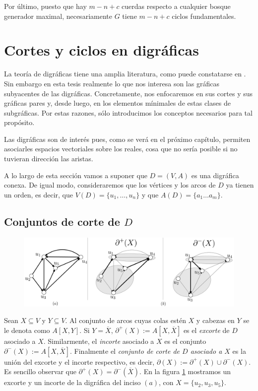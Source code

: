   Por último, puesto que hay $m - n + c$ cuerdas respecto a cualquier bosque generador maximal, necesariamente $G$ tiene $m-n+c$ ciclos fundamentales.
 
 \section{Cortes y ciclos en digráficas}
 La teoría de digráficas tiene una amplia literatura, como puede constatarse en \cite{Bang-Jensen}. Sin embargo en esta tesis realmente lo que nos interesa son las gráficas subyacentes de las digráficas. Concretamente, nos enfocaremos en sus cortes y sus gráficas pares y, desde luego, en los elementos mínimales de estas clases de subgráficas. Por estas razones, sólo introducimos los conceptos necesarios para tal propósito.
 
 Las digráficas son de interés pues, como se verá en el próximo capítulo, permiten asociarles espacios vectoriales sobre los reales, cosa que no sería posible si no tuvieran dirección las aristas. 
 
 A lo largo de esta sección vamos a suponer que $D = (V,A)$ es una digráfica conexa. De igual modo, consideraremos que los vértices y los arcos de $D$ ya tienen un orden, es decir, que $V(D)=\{u_{1}, \ldots, u_{n}\}$ y que $A(D)= \{ a_{1} \ldots a_{m}\}$.


 \subsection{Conjuntos de corte de $D$}
 \begin{figure}[h]
    \centering
\includegraphics[scale=0.18]{img/imgchapter2/ExcorteIncorte.jpg}
    \caption{}
    \label{fig:excorteincorte}
\end{figure}
 
 Sean $X \subseteq V$ y $Y \subseteq V$. Al conjunto de arcos cuyas colas estén $X$ y cabezas en $Y$ se le denota como $A[X,Y]$. Si $Y = \overline{X}$, $\partial^{+} (X) := A[X,\overline{X}]$ es el \textit{excorte} de $D$ asociado a $X$. Similarmente, el \textit{incorte} asociado a $X$ es el conjunto $\partial^{-}(X) := A[X,\overline{X}]$. Finalmente el \textit{conjunto de corte de $D$ asociado a $X$} es la unión del excorte y el incorte respectivo, es decir, $\partial(X) := \partial^{+}(X) \cup \partial^{-}(X)$. Es sencillo observar que $\partial^{+}(X) = \partial^{-}(\overline{X})$. En la figura \ref{fig:excorteincorte} mostramos un excorte y un incorte de la digráfica del inciso $(a)$, con $X=\{u_{2},u_{3},u_{5}\}$.

